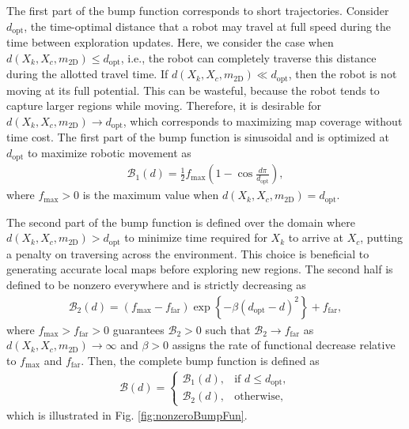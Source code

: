 \documentclass[smallextended]{svjour3}       %
\newcommand{\braces}[1]{\ensuremath{\left\{ #1 \right\}}}
\begin{document}
The first part of the bump function corresponds to short trajectories. Consider $d_\text{opt}$, the time-optimal distance that a robot may travel at full speed during the time between exploration updates. Here, we consider the case when $d(X_k,X_c,m_\text{2D})\leq d_\text{opt}$, i.e., the robot can completely traverse this distance during the allotted travel time. If $d(X_k,X_c,m_\text{2D})\ll d_\text{opt}$, then the robot is not moving at its full potential. This can be wasteful, because the robot tends to capture larger regions while moving. Therefore, it is desirable for $d(X_k,X_c,m_\text{2D})\rightarrow d_\text{opt}$, which corresponds to maximizing map coverage without time cost. The first part of the bump function is sinusoidal and is optimized at $d_\text{opt}$ to maximize robotic movement as
\begin{align}
\label{eqn:BumpFunIncreasing}
\mathcal B_1(d)=\frac12 f_\text{max}\left(1-\cos{\frac{d\pi}{d_\text{opt}}}\right),
\end{align}
where $f_\text{max}>0$ is the maximum value when $d(X_k,X_c,m_\text{2D})=d_\text{opt}$.

The second part of the bump function is defined over the domain where \\$d(X_k,X_c,m_\text{2D})>d_\text{opt}$ to minimize time required for $X_k$ to arrive at $X_c$, putting a penalty on traversing across the environment. This choice is beneficial to generating accurate local maps before exploring new regions. The second half is defined to be nonzero everywhere and is strictly decreasing as 
\begin{align}
\label{eqn:BumpFunDecreasing}
\mathcal B_2(d)=(f_\text{max}-f_\text{far})\exp\braces{-\beta(d_\text{opt}-d)^2}+f_\text{far},
\end{align}
where $f_\text{max}>f_\text{far}>0$ guarantees $\mathcal B_2>0$ such that $\mathcal B_2\rightarrow f_\text{far}$ as $d(X_k,X_c,m_\text{2D})\rightarrow\infty$ and $\beta>0$ assigns the rate of functional decrease relative to $f_\text{max}$ and $f_\text{far}$. Then, the complete bump function is defined as
\begin{align}
\label{eqn:BumpFun}
\mathcal B(d)=
\begin{cases}
    \mathcal B_1(d),		& \text{if }d\leq d_\text{opt},\\
    \mathcal B_2(d),         & \text{otherwise},
\end{cases}
\end{align}
which is illustrated in Fig. \ref{fig:nonzeroBumpFun}. %
\end{document}
